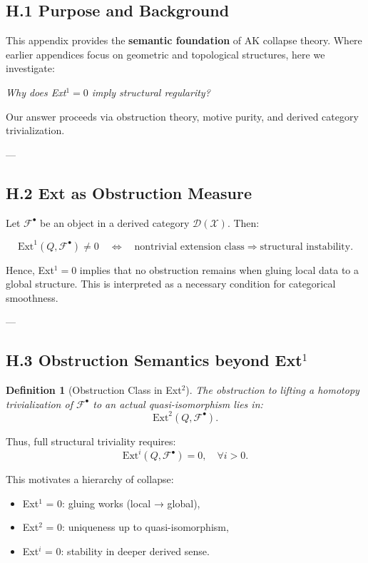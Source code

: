 \documentclass[11pt]{article}
\newtheorem{definition}[theorem]{Definition}
\begin{document}
\subsection*{H.1 Purpose and Background}

This appendix provides the \textbf{semantic foundation} of AK collapse theory.  
Where earlier appendices focus on geometric and topological structures, here we investigate:

\begin{center}
\textit{Why does Ext$^1 = 0$ imply structural regularity?}  
\end{center}

Our answer proceeds via obstruction theory, motive purity, and derived category trivialization.

---

\subsection*{H.2 Ext as Obstruction Measure}

Let $\mathcal{F}^\bullet$ be an object in a derived category $\mathcal{D}(\mathcal{X})$.  
Then:

\[
\mathrm{Ext}^1(Q, \mathcal{F}^\bullet) \neq 0 \quad \Leftrightarrow \quad 
\text{nontrivial extension class} \Rightarrow \text{structural instability}.
\]

Hence, Ext$^1 = 0$ implies that no obstruction remains when gluing local data to a global structure.  
This is interpreted as a necessary condition for categorical smoothness.

---

\subsection*{H.3 Obstruction Semantics beyond Ext$^1$}

\begin{definition}[Obstruction Class in Ext$^2$]
The obstruction to lifting a homotopy trivialization of $\mathcal{F}^\bullet$ to an actual quasi-isomorphism lies in:
\[
\mathrm{Ext}^2(Q, \mathcal{F}^\bullet).
\]
\end{definition}

Thus, full structural triviality requires:
\[
\mathrm{Ext}^i(Q, \mathcal{F}^\bullet) = 0, \quad \forall i > 0.
\]

This motivates a hierarchy of collapse:

\begin{itemize}
  \item Ext$^1$ = 0: gluing works (local → global),
  \item Ext$^2$ = 0: uniqueness up to quasi-isomorphism,
  \item Ext$^i$ = 0: stability in deeper derived sense.
\end{itemize}
\end{document}
